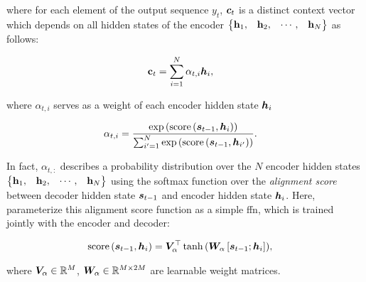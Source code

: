 where for each element of the output sequence $y_t$, $\cvect_t$ is a distinct context vector which depends on all hidden states of the encoder $\begin{Bmatrix} \hvect_1, & \hvect_2, & \cdots, & \hvect_N \end{Bmatrix}$ as follows:

\begin{align}
    \label{eq:context_vector_weighted_sum}
    \cvect_t &= \sum_{i=1}^{N} \alpha_{t,i} \hvect_i,
\end{align}

where $\alpha_{t,i}$ serves as a weight of each encoder hidden state $\hvect_i$

\begin{align}
    \label{eq:softmax_scoring_function}
    \alpha_{t,i} &= \frac{\expp{\scoree{\svect_{t-1}, \hvect_i}}}{\sum_{i'=1}^N \expp{\scoree{\svect_{t-1}, \hvect_{i'}}}}.
\end{align}

In fact, $\alpha_{t,:}$ describes a probability distribution over the $N$ encoder hidden states $\begin{Bmatrix} \hvect_1, & \hvect_2, & \cdots, & \hvect_N \end{Bmatrix}$ using the softmax function over the \emph{alignment score} between decoder hidden state $\svect_{t-1}$ and encoder hidden state $\hvect_i$. Here, \citet{bahdanau2014neural} parameterize this alignment score function as a simple \gls{ffn}, which is trained jointly with the encoder and decoder:

\begin{align}
    \label{eq:bahdanau_scoring_function}
    \scoree{\svect_{t-1}, \hvect_i} &= \vect{V}_{\alpha}^{\top} \tanhh{\Wvect_{\alpha} \left[ \svect_{t-1}; \hvect_i \right]},
\end{align}

where $\vect{V}_{\alpha} \in \reals{M}$, $\Wvect_{\alpha} \in \reals{M \times 2M}$ are learnable weight matrices.


